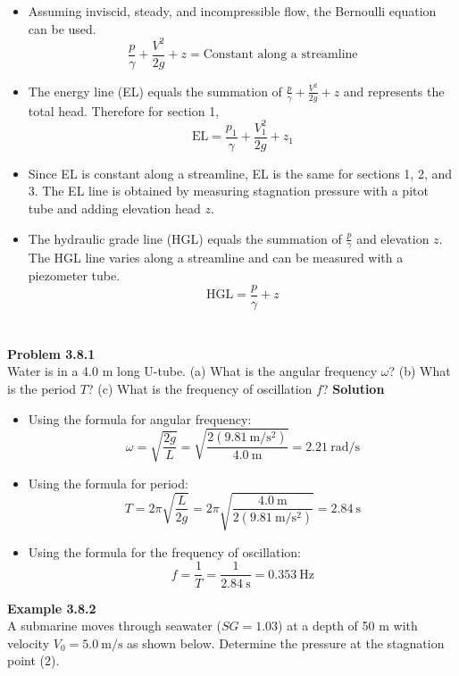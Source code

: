 ﻿\documentclass[12pt]{article}
\begin{document}
\begin{itemize}
    \item Assuming inviscid, steady, and incompressible flow, the Bernoulli equation can be used.
    \[\frac{p}{\gamma}+\frac{V^2}{2g}+z=\text{Constant along a streamline}\]
    \item The energy line (EL) equals the summation of $\frac{p}{\gamma}+\frac{V^2}{2g}+z$ and represents the total head. Therefore for section 1,
    \[\mathrm{EL}=\frac{p_1}{\gamma}+\frac{V_1^2}{2g}+z_1\]
    \item Since EL is constant along a streamline, EL is the same for sections 1, 2, and 3. The EL line is obtained by measuring stagnation pressure with a pitot tube and adding elevation head $z$.
    \item The hydraulic grade line (HGL) equals the summation of $\frac{p}{\gamma}$ and elevation $z$. The HGL line varies along a streamline and can be measured with a piezometer tube.
    \[\mathrm{HGL}=\frac{p}{\gamma}+z\]
\end{itemize}

\section*{}

\textbf{Problem 3.8.1}\\
Water is in a 4.0 m long U-tube. (a) What is the angular frequency $\omega$? (b) What is the period $T$? (c) What is the frequency of oscillation $f$?
\newpage
\textbf{Solution}
\begin{itemize}
    \item[(a)] Using the formula for angular frequency:
    \[\boxed{\omega=\sqrt{\frac{2g}{L}}=\sqrt{\frac{2(9.81\ \mathrm{m/s^2})}{4.0\ \mathrm{m}}}=2.21\ \mathrm{rad/s}}\]
    \item[(b)] Using the formula for period:
    \[\boxed{T=2\pi\sqrt{\frac{L}{2g}}=2\pi\sqrt{\frac{4.0\ \mathrm{m}}{2(9.81\ \mathrm{m/s^2})}}=2.84\ \mathrm{s}}\]
    \item[(c)] Using the formula for the frequency of oscillation:
    \[\boxed{f=\frac{1}{T}=\frac{1}{2.84\ \mathrm{s}}=0.353\ \mathrm{Hz}}\]
\end{itemize}

\textbf{Example 3.8.2}\\
A submarine moves through seawater ($SG=1.03$) at a depth of 50 m with velocity $V_0=5.0\ \mathrm{m/s}$ as shown below. Determine the pressure at the stagnation point (2).
\end{document}
